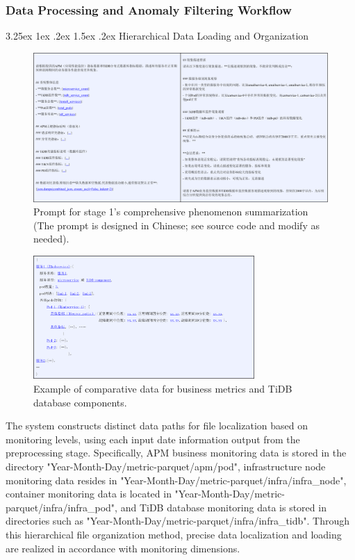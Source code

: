 \documentclass[10pt]{article}
\makeatletter
\renewcommand{\paragraph}{%
    \@startsection{paragraph}{4}{\z@}%
    {3.25ex \@plus1ex \@minus.2ex}%
    {1.5ex \@plus.2ex}%
    {\normalfont\normalsize\itshape}%
}
\makeatother
\begin{document}
\subsubsection{Data Processing and Anomaly Filtering Workflow}

\paragraph{Hierarchical Data Loading and Organization}

\begin{figure}[htbp]
    \centering
    \includegraphics[width=1.0\textwidth]{fig13.png}
    \caption{Prompt for stage 1's comprehensive phenomenon summarization (The prompt is designed in Chinese; see source code and modify as needed).}
    \label{fig13}
\end{figure}

\begin{figure}[!t]
    \centering
    \includegraphics[width=0.75\textwidth]{fig14.png}
    \caption{Example of comparative data for business metrics and TiDB database components.}
    \label{fig14}
\end{figure}

The system constructs distinct data paths for file localization based on monitoring levels, using each input date information output from the preprocessing stage. Specifically, APM business monitoring data is stored in the directory "Year-Month-Day/metric-parquet/apm/pod", infrastructure node monitoring data resides in "Year-Month-Day/metric-parquet/infra/infra\_node", container monitoring data is located in "Year-Month-Day/metric-parquet/infra/infra\_pod", and TiDB database monitoring data is stored in directories such as "Year-Month-Day/metric-parquet/infra/infra\_tidb". Through this hierarchical file organization method, precise data localization and loading are realized in accordance with monitoring dimensions.
\end{document}
